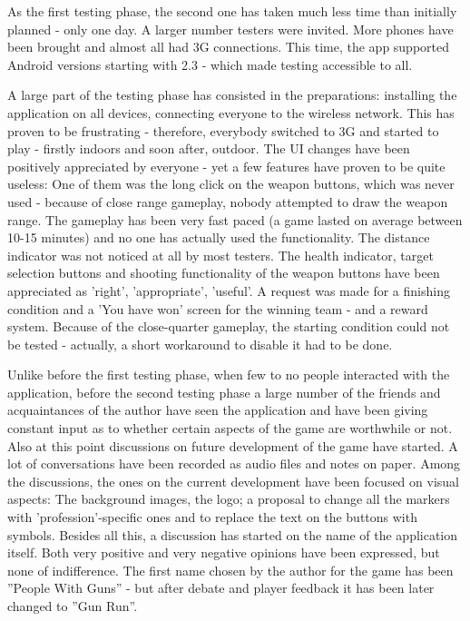 As the first testing phase, the second one has taken much less time than
initially planned - only one day. A larger number testers were invited. More
phones have been brought and almost all had 3G connections. This time, the app
supported Android versions starting with 2.3 - which made testing accessible to
all.\newline

A large part of the testing phase has consisted in the preparations: installing
the application on all devices, connecting everyone to the wireless network.
This has proven to be frustrating - therefore, everybody switched to 3G and
started to play - firstly indoors and soon after, outdoor. The UI changes have
been positively appreciated by everyone - yet a few features have proven to be
quite useless: One of them was the long click on the weapon buttons, which was
never used - because of close range gameplay, nobody attempted to draw the
weapon range. The gameplay has been very fast paced (a game lasted on average
between 10-15 minutes) and no one has actually used the functionality. The
distance indicator was not noticed at all by most testers. The health indicator,
target selection buttons and shooting functionality of the weapon buttons have
been appreciated as 'right', 'appropriate', 'useful'. A request was made for a
finishing condition and a 'You have won' screen for the winning team - and a
reward system. Because of the close-quarter gameplay, the starting condition
could not be tested - actually, a short workaround to disable it had to be
done.\newline

Unlike before the first testing phase, when few to no people interacted with
the application, before the second testing phase a large number of the friends
and acquaintances of the author have seen the application and have been giving
constant input as to whether certain aspects of the game are worthwhile or not.
Also at this point discussions on future development of the game have started. A
lot of conversations have been recorded as audio files and notes on paper. Among
the discussions, the ones on the current development have been focused on visual
aspects: The background images, the logo; a proposal to change all the markers
with 'profession'-specific ones and to replace the text on the buttons with
symbols. Besides all this, a discussion has started on the name of the
application itself. Both very positive and very negative opinions have been
expressed, but none of indifference. The first name chosen by the author for the
game has been ''People With Guns'' - but after debate and player feedback it has
been later changed to ''Gun Run''.\newline

